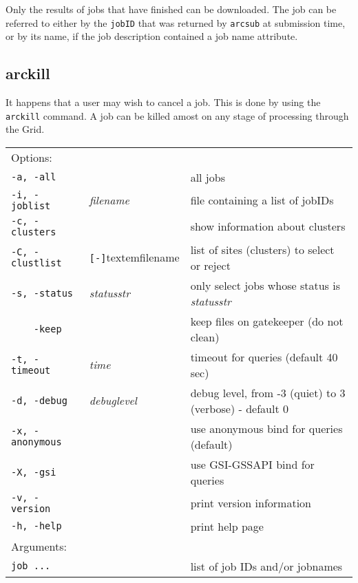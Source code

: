 Only the results of jobs that have finished can be downloaded. The job
can be referred to either by the \texttt{jobID} that was returned by
\texttt{arcsub} at submission time, or by its name, if the job
description contained a job name attribute.

\subsection{arckill}
\label{sec:arckill}

It happens that a user may wish to cancel a job. This is done by using
the \texttt{arckill}  command. A
job can be killed amost on any stage of processing through the Grid.

\hspace*{0.5cm}
\begin{shaded}
\end{shaded}
\begin{longtable}{llp{8cm}}
   Options:&&\\
   \texttt{-a, -all}& & all jobs\\
   \texttt{-i, -joblist}& \textit{filename} & file containing a list of jobIDs\\
   \texttt{-c, -clusters}& & show information about clusters\\
   \texttt{-C, -clustlist}&\verb#[-]#textem{filename}&list of sites (clusters) to select or reject\\
   \texttt{-s, -status}& \textit{statusstr} &only select jobs whose status is \textit{statusstr}\\
   \texttt{~~~~-keep}& & keep files on gatekeeper (do not clean)\\
   \texttt{-t, -timeout}& \textit{time} & timeout for queries (default 40 sec)\\
   \texttt{-d, -debug}& \textit{debuglevel} &debug level, from -3 (quiet) to 3 (verbose) - default 0\\
   \texttt{-x, -anonymous}& & use anonymous bind for queries (default)\\
   \texttt{-X, -gsi}& & use GSI-GSSAPI bind for queries\\
   \texttt{-v, -version}& & print version information\\
   \texttt{-h, -help}& & print help page\\
   Arguments:&&\\
   \texttt{job ...} && list of job IDs and/or jobnames\\
\end{longtable}

